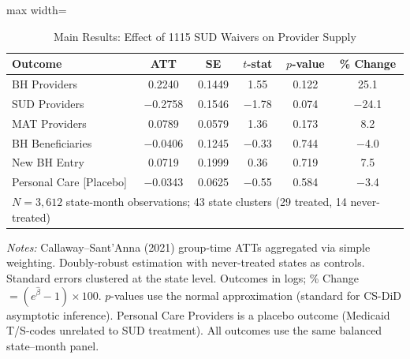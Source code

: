 \begin{table}[htbp]
\centering
\caption{Main Results: Effect of 1115 SUD Waivers on Provider Supply}
\label{tab:main_results}
\begin{threeparttable}
\begin{adjustbox}{max width=\textwidth}
\begin{tabular}{lccccc}
\toprule
Outcome & ATT & SE & $t$-stat & $p$-value & \% Change \\
\midrule
BH Providers & 0.2240 & 0.1449 & 1.55 & 0.122 & 25.1 \\
SUD Providers & $-$0.2758 & 0.1546 & $-$1.78 & 0.074 & $-$24.1 \\
MAT Providers & 0.0789 & 0.0579 & 1.36 & 0.173 & 8.2 \\
BH Beneficiaries & $-$0.0406 & 0.1245 & $-$0.33 & 0.744 & $-$4.0 \\
New BH Entry & 0.0719 & 0.1999 & 0.36 & 0.719 & 7.5 \\
Personal Care [Placebo] & $-$0.0343 & 0.0625 & $-$0.55 & 0.584 & $-$3.4 \\
\midrule
\multicolumn{6}{l}{$N = 3{,}612$ state-month observations; 43 state clusters (29 treated, 14 never-treated)} \\
\bottomrule
\end{tabular}
\end{adjustbox}
\begin{tablenotes}[flushleft]
\small
\item \textit{Notes:} Callaway--Sant'Anna (2021) group-time ATTs aggregated via simple weighting. Doubly-robust estimation with never-treated states as controls. Standard errors clustered at the state level. Outcomes in logs; \% Change $= (e^{\hat{\beta}} - 1) \times 100$. $p$-values use the normal approximation (standard for CS-DiD asymptotic inference). Personal Care Providers is a placebo outcome (Medicaid T/S-codes unrelated to SUD treatment). All outcomes use the same balanced state--month panel.
\end{tablenotes}
\end{threeparttable}
\end{table}
